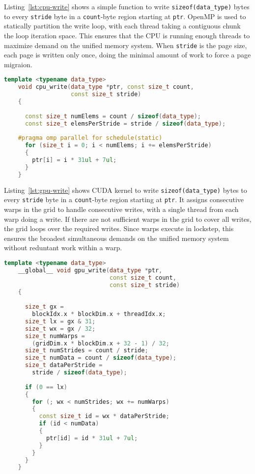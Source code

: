 Listing~\ref{lst:cpu-write} shows a simple function to write \texttt{sizeof(data\_type)} bytes to every \texttt{stride} byte in a \texttt{count}-byte region starting at \texttt{ptr}.
OpenMP is used to statically partition the write loop, with each thread taking a contiguous chunk the loop iteration space.
This ensures that the CPU is running enough threads to maximize demand on the unified memory system.
When \texttt{stride} is the page size, each page is written only once, doing the minimal amount of work to force a page migraion.

\begin{lstlisting}[language=c++, caption=\texttt{cpu\_write} function for Algorithm~\ref{alg:um-coherence-bw}, label=lst:cpu-write]
    template <typename data_type>
    void cpu_write(data_type *ptr, const size_t count,
                   const size_t stride)
    {
    
      const size_t numElems = count / sizeof(data_type);
      const size_t elemsPerStride = stride / sizeof(data_type);
    
    #pragma omp parallel for schedule(static)
      for (size_t i = 0; i < numElems; i += elemsPerStride)
      {
        ptr[i] = i * 31ul + 7ul;
      }
    }
\end{lstlisting}

Listing~\ref{lst:gpu-write} shows CUDA kernel to write \texttt{sizeof(data\_type)} bytes to every \texttt{stride} byte in a \texttt{count}-byte region starting at \texttt{ptr}.
It assigns consecutive warps in the grid to handle consecutive writes, with a single thread from each warp doing a write.
If there are not sufficient warps in the grid to cover all writes, the grid loops over the required writes.
Since warps execute in lockstep, this ensures the broadest simultaneous demands on the unified memory system without reduntant work within a warp.

\begin{lstlisting}[language=c++, caption=\texttt{gpu\_write} function for Algorithm~\ref{alg:um-coherence-bw}, label=lst:gpu-write]
    template <typename data_type>
    __global__ void gpu_write(data_type *ptr,
                              const size_t count,
                              const size_t stride)
    {
    
      size_t gx = 
        blockIdx.x * blockDim.x + threadIdx.x;
      size_t lx = gx & 31;
      size_t wx = gx / 32;
      size_t numWarps = 
        (gridDim.x * blockDim.x + 32 - 1) / 32;
      size_t numStrides = count / stride;
      size_t numData = count / sizeof(data_type);
      size_t dataPerStride = 
        stride / sizeof(data_type);
    
      if (0 == lx)
      {
        for (; wx < numStrides; wx += numWarps)
        {
          const size_t id = wx * dataPerStride;
          if (id < numData)
          {
            ptr[id] = id * 31ul + 7ul;
          }
        }
      }
    }
\end{lstlisting}



